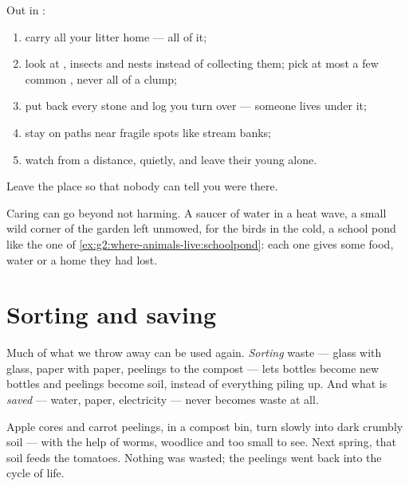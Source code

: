 \begin{method}\label{met:g2:caring-for-nature:rules}
Out in :
\begin{enumerate}
  \item carry all your litter home --- all of it;
  \item look at , insects and nests instead of collecting
        them; pick at most a few common , never all of a
        clump;
  \item put back every stone and log you turn over --- someone
        lives under it;
  \item stay on paths near fragile spots like stream banks;
  \item watch  from a distance, quietly, and leave their
        young alone.
\end{enumerate}
Leave the place so that nobody can tell you were there.
\end{method}

\begin{example}\label{ex:g2:caring-for-nature:help}
Caring can go beyond not harming. A saucer of water in a heat
wave, a small wild corner of the garden left unmowed,  for
the birds in the cold, a school pond like the one of
\cref{ex:g2:where-animals-live:schoolpond}: each one gives some
 food, water or a home they had lost.
\end{example}

\section{Sorting and saving}

\begin{proposition}\label{prop:g2:caring-for-nature:recycle}
Much of what we throw away can be used again.
\emph{Sorting} waste --- glass with glass,
paper with paper, peelings to the compost --- lets bottles become
new bottles and peelings become soil, instead of everything piling
up. And what is \emph{saved} --- water, paper, electricity ---
never becomes waste at all.
\end{proposition}
\admitted

\begin{example}\label{ex:g2:caring-for-nature:compost}
Apple cores and carrot peelings, in a compost bin, turn slowly
into dark crumbly soil --- with the help of worms, woodlice and
 too small to see. Next spring, that soil feeds the
tomatoes. Nothing was wasted; the peelings went back into the
cycle of life.
\end{example}

